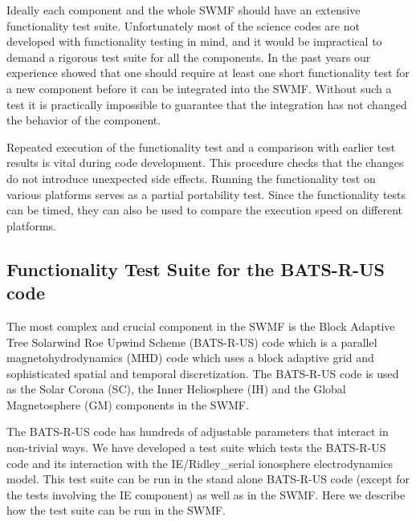 \documentclass[twoside,10pt]{article}
\begin{document}
Ideally each component and the whole SWMF should have an extensive
functionality test suite. 
Unfortunately most of the science codes are not developed with 
functionality testing in mind, and it would be impractical to demand
a rigorous test suite for all the components. In the past years
our experience showed that one should require at least one short
functionality test for a new component before it can be integrated into
the SWMF. Without such a test it is practically impossible to guarantee
that the integration has not changed the behavior of the component.

Repeated execution of the functionality test and a
comparison with earlier test results is vital during code development.
This procedure checks that the changes do not introduce unexpected side 
effects. Running the functionality test on various
platforms serves as a partial portability test. Since the 
functionality tests can be timed, they can also be used to compare
the execution speed on different platforms.

\subsection{Functionality Test Suite for the BATS-R-US code}

The most complex and crucial component in the SWMF is the 
Block Adaptive Tree Solarwind Roe Upwind Scheme (BATS-R-US) code
which is a parallel magnetohydrodynamics (MHD) code which uses a
block adaptive grid and sophisticated spatial and temporal discretization.
The BATS-R-US code is used as the Solar Corona (SC), the Inner Heliosphere (IH)
and the Global Magnetosphere (GM) components in the SWMF.

The BATS-R-US code has hundreds of adjustable parameters that interact
in non-trivial ways. We have developed a test suite
which tests the BATS-R-US code and its interaction with the IE/Ridley\_serial
ionosphere electrodynamics model. This test suite can be run in
the stand alone BATS-R-US code (except for the tests involving the
IE component) as well as in the SWMF. Here we describe how the
test suite can be run in the SWMF.
\end{document}
